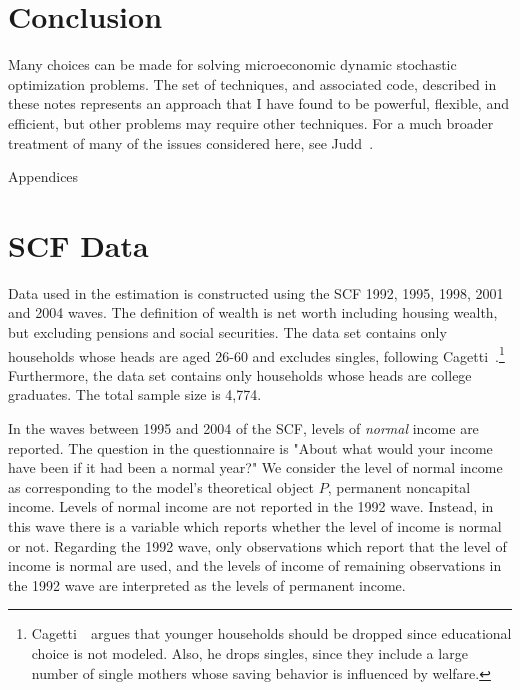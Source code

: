 \documentclass[titlepage, headings=optiontotocandhead]{econark}
\begin{document}
\section{Conclusion}

Many choices can be made for solving microeconomic dynamic stochastic optimization problems.  The set of techniques, and associated code, described in these notes represents an approach that I have found to be powerful, flexible, and efficient, but other problems may require other techniques.  For a much broader treatment of many of the issues considered here, see Judd~\citeyearpar{judd:book}.



\clearpage\vfill\eject

\centerline{\LARGE Appendices}\vspace{0.2in}

\appendix


\hypertarget{scf-data}{}
\section{SCF Data}\label{app:scf-data}

Data used in the estimation is constructed using the SCF 1992, 1995, 1998, 2001 and 2004 waves. The definition of wealth is net worth including housing wealth, but excluding pensions and social securities. The data set contains only households whose heads are aged 26-60 and excludes singles, following Cagetti~\citeyearpar{cagettiWprofiles}.\footnote{Cagetti~\citeyearpar{cagettiWprofiles}\ argues that younger households should be dropped since educational choice is not modeled. Also, he drops singles, since they include a large number of single mothers whose saving behavior is influenced by welfare.} Furthermore, the data set contains only households whose heads are college graduates. The total sample size is 4,774.

In the waves between 1995 and 2004 of the SCF, levels of \textit{normal} income are reported. The question in the questionnaire is "About what would your income have been if it had been a normal year?" We consider the level of normal income as corresponding to the model's theoretical object $P$, permanent noncapital income. Levels of normal income are not reported in the 1992 wave. Instead, in this wave there is a variable which reports whether the level of income is normal or not. Regarding the 1992 wave, only observations which report that the level of income is normal are used, and the levels of income of remaining observations in the 1992 wave are interpreted as the levels of permanent income.
\end{document}
